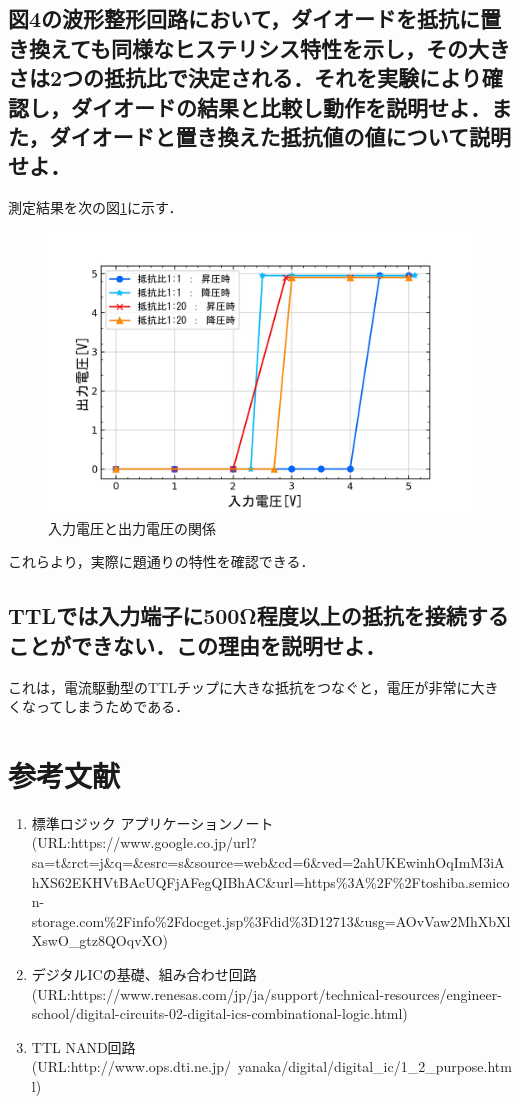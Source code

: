\documentclass[10pt, a4j, dvipdfmx]{jarticle}
\begin{document}
\subsection{図4の波形整形回路において，ダイオードを抵抗に置き換えても同様なヒステリシス特性を示し，その大きさは2つの抵抗比で決定される．それを実験により確認し，ダイオードの結果と比較し動作を説明せよ．また，ダイオードと置き換えた抵抗値の値について説明せよ．}
測定結果を次の図\ref{fig:7.3.graph}に示す．
\begin{figure}[H]
	\centering
	\includegraphics[width=0.8\hsize]{images/Experiment/7_3_graph.jpg}
	\caption{入力電圧と出力電圧の関係}
	\label{fig:7.3.graph}
\end{figure}
これらより，実際に題通りの特性を確認できる．

\subsection{TTLでは入力端子に500Ω程度以上の抵抗を接続することができない．この理由を説明せよ．}
これは，電流駆動型のTTLチップに大きな抵抗をつなぐと，電圧が非常に大きくなってしまうためである．


\section{参考文献}
\begin{enumerate}
	\item 標準ロジック アプリケーションノート\\ (URL:https://www.google.co.jp/url?sa=t\&rct=j\&q=\&esrc=s\&source=web\&cd=6\&ved=2ahUKEwinhOqImM3iAhXS62EKHVtBAcUQFjAFegQIBhAC\&url=https\%3A\%2F\%2Ftoshiba.semicon-storage.com\%2Finfo\%2Fdocget.jsp\%3Fdid\%3D12713\&usg=AOvVaw2MhXbXlXswO\_gtz8QOqvXO)
	\item デジタルICの基礎、組み合わせ回路\\(URL:https://www.renesas.com/jp/ja/support/technical-resources/engineer-school/digital-circuits-02-digital-ics-combinational-logic.html)
	\item TTL NAND回路\\(URL:http://www.ops.dti.ne.jp/~yanaka/digital/digital\_ic/1\_2\_purpose.html)
\end{enumerate}
\end{document}
